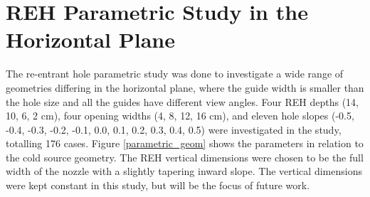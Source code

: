 \documentclass[a4paper]{jpconf}
\begin{document}
\section{REH Parametric Study in the Horizontal Plane}

The re-entrant hole parametric study was done to investigate a wide range of geometries differing in the horizontal plane, where the guide width is smaller than the hole size and all the guides have different view angles.  Four REH depths (14, 10, 6, 2 cm), four opening widths (4, 8, 12, 16 cm), and eleven hole slopes (-0.5, -0.4, -0.3, -0.2, -0.1, 0.0, 0.1, 0.2, 0.3, 0.4, 0.5) were investigated in the study, totalling 176 cases. Figure \ref{parametric_geom} shows the parameters in relation to the cold source geometry.  The REH vertical dimensions were chosen to be the full width of the nozzle with a slightly tapering inward slope.  The vertical dimensions were kept constant in this study, but will be the focus of future work.
\end{document}
